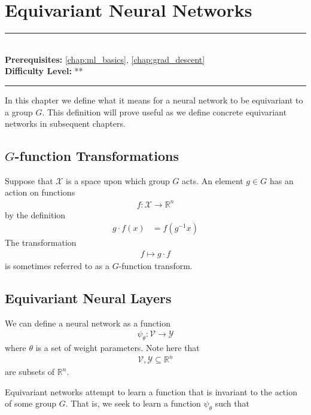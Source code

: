 \documentclass[book.tex]{subfiles}
\begin{document}
\chapter{Equivariant Neural Networks}
\label{chap:equivariant_networks}
\noindent\rule{11cm}{0.4pt} \\
\textbf{Prerequisites:}  \autoref{chap:ml_basics}, \autoref{chap:grad_descent}  \\
\textbf{Difficulty Level:} ** \\
\noindent\rule{11cm}{0.4pt}
\vspace{5mm}

In this chapter we define what it means for a neural network to be equivariant to a group $G$. This definition will prove useful as we define concrete equivariant networks in subsequent chapters.

\section{$G$-function Transformations}
Suppose that $\mathcal{X}$ is a space upon which group $G$ acts. An element $g \in G$ has an action on functions
\begin{align}
f: \mathcal{X} \to \mathbb{R}^n
\end{align}
by the definition
\begin{align}
g \cdot f (x) &= f(g^{-1}x)
\end{align}
The transformation
\begin{align}
f \mapsto g \cdot f
\end{align}
is sometimes referred to as a $G$-function transform.


\section{Equivariant Neural Layers}


We can define a neural network as a function
\begin{align}
\psi_\theta: \mathcal{V} \to \mathcal{Y}
\end{align}
where $\theta$ is a set of weight parameters. Note here that \begin{align}
\mathcal{V}, \mathcal{Y} \subseteq \mathbb{R}^n
\end{align}
are subsets of $\mathbb{R}^n$.

Equivariant networks attempt to learn a function that is invariant to the action of some group $G$. That is, we seek to learn a function $\psi_\theta$ such that
\end{document}

